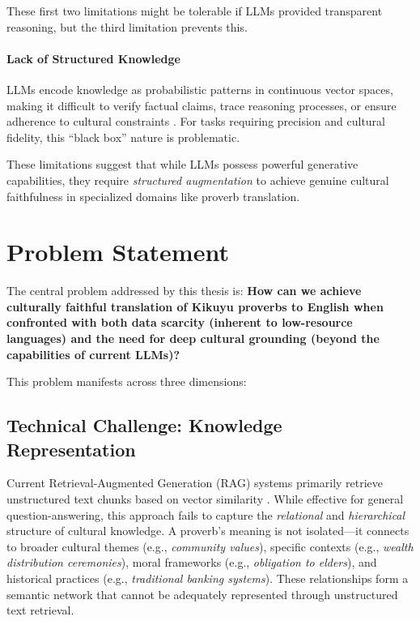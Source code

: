 These first two limitations might be tolerable if LLMs provided transparent reasoning, but the third limitation prevents this.

\paragraph{Lack of Structured Knowledge} LLMs encode knowledge as probabilistic patterns in continuous vector spaces, making it difficult to verify factual claims, trace reasoning processes, or ensure adherence to cultural constraints \cite{borgeaud2022improving}. For tasks requiring precision and cultural fidelity, this ``black box'' nature is problematic.

These limitations suggest that while LLMs possess powerful generative capabilities, they require \emph{structured augmentation} to achieve genuine cultural faithfulness in specialized domains like proverb translation.

\section{Problem Statement}
\label{sec:problem_statement}

The central problem addressed by this thesis is: \textbf{How can we achieve culturally faithful translation of Kikuyu proverbs to English when confronted with both data scarcity (inherent to low-resource languages) and the need for deep cultural grounding (beyond the capabilities of current LLMs)?}

This problem manifests across three dimensions:

\subsection{Technical Challenge: Knowledge Representation}
\label{subsec:tech_challenge}

Current Retrieval-Augmented Generation (RAG) systems primarily retrieve unstructured text chunks based on vector similarity \cite{lewis2020retrieval}. While effective for general question-answering, this approach fails to capture the \emph{relational} and \emph{hierarchical} structure of cultural knowledge. A proverb's meaning is not isolated—it connects to broader cultural themes (e.g., \emph{community values}), specific contexts (e.g., \emph{wealth distribution ceremonies}), moral frameworks (e.g., \emph{obligation to elders}), and historical practices (e.g., \emph{traditional banking systems}). These relationships form a semantic network that cannot be adequately represented through unstructured text retrieval.

